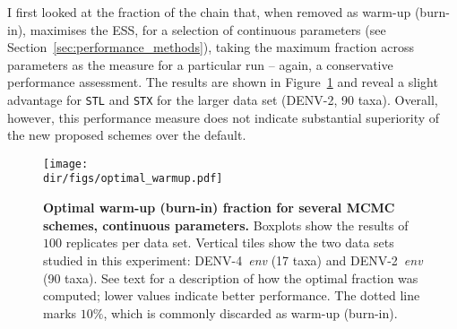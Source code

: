 I first looked at the fraction of the chain that, when removed as warm-up (burn-in), maximises the ESS, for a selection of continuous parameters (see Section~\ref{sec:performance_methods}), taking the maximum fraction across parameters as the measure for a particular run -- again, a conservative performance assessment.
The results are shown in Figure~\ref{fig:optimal_burnin} and reveal a slight advantage for \verb|STL| and \verb|STX| for the larger data set (DENV-2, 90 taxa).
Overall, however, this performance measure does not indicate substantial superiority of the new proposed schemes over the default.
\begin{figure}[!ht]
\begin{center}
\texttt{[image: \\dir/figs/optimal\_warmup.pdf]} 
\end{center}
 \caption[Optimal warm-up (burn-in) fraction for several MCMC schemes, continuous parameters.]{\textbf{Optimal warm-up (burn-in) fraction for several MCMC schemes, continuous parameters.}
   Boxplots show the results of $100$ replicates per data set.
  Vertical tiles show the two data sets studied in this experiment: DENV-4~\textit{env} (17 taxa) and DENV-2~\textit{env} (90 taxa).
  See text for a description of how the optimal fraction was computed; lower values indicate better performance.
  The dotted line marks $10\%$, which is commonly discarded as warm-up (burn-in).
  }
 \label{fig:optimal_burnin}
\end{figure}

